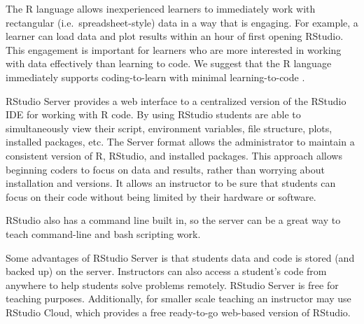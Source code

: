 The R language allows inexperienced learners to immediately work with rectangular (i.e.\ spreadsheet-style) data in a way that is engaging. For example, a learner can load data and plot results within an hour of first opening RStudio. This engagement is important for learners who are more interested in working with data effectively than learning to code. We suggest that the R language immediately supports coding-to-learn with minimal learning-to-code \citep{}.

RStudio Server provides a web interface to a centralized version of the RStudio IDE for working with R code. By using RStudio students are able to simultaneously view their script, environment variables, file structure, plots, installed packages, etc. The Server format allows the administrator to maintain a consistent version of R, RStudio, and installed packages. This approach allows beginning coders to focus on data and results, rather than worrying about installation and versions. It allows an instructor to be sure that students can focus on their code without being limited by their hardware or software.
 

RStudio also has a command line built in, so the server can be a great way to teach command-line and bash scripting work.

Some advantages of RStudio Server is that students data and code is stored (and backed up) on the server. 
Instructors can also access a student's code from anywhere to help students solve problems remotely.
RStudio Server is free for teaching purposes.
Additionally, for smaller scale teaching an instructor may use RStudio Cloud, which provides a free ready-to-go web-based version of RStudio.

